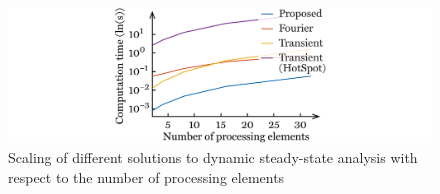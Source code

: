 \begin{figure}
  \centering
  \includegraphics[width=1.0\linewidth]{include/assets/figures/utopia-dynamic-steady-state-speed-elements.pdf}
  \caption{
    Scaling of different solutions to dynamic steady-state analysis with respect
    to the number of processing elements
  }
\end{figure}
